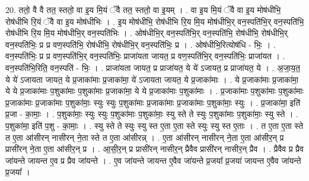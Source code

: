 \documentclass[17pt]{extarticle}
\begin{document}
20. ततो॒ वै वै तत॒ स्ततो॒ वा इ॒य मि॒यं ॅवै तत॒ स्ततो॒ वा इ॒यम् । . वा इ॒य मि॒यं ॅवै वा इ॒य मोष॑धीभि॒ रोष॑धीभि रि॒यं ॅवै वा इ॒य मोष॑धीभिः । . इ॒य मोष॑धीभि॒ रोष॑धीभि रि॒य मि॒य मोष॑धीभि॒र् वन॒स्पति॑भि॒र् वन॒स्पति॑भि॒ रोष॑धीभि रि॒य मि॒य मोष॑धीभि॒र् वन॒स्पति॑भिः । . ओष॑धीभि॒र् वन॒स्पति॑भि॒र् वन॒स्पति॑भि॒ रोष॑धीभि॒ रोष॑धीभि॒र् वन॒स्पति॑भिः॒ प्र प्र वण॒स्पति॑भि॒ रोष॑धीभि॒ रोष॑धीभि॒र् वन॒स्पति॑भिः॒ प्र । . ओष॑धीभि॒रित्योष॑धि - भिः॒ । . वन॒स्पति॑भिः॒ प्र प्र वण॒स्पति॑भि॒र् वन॒स्पति॑भिः॒ प्राजा॑यता जायत॒ प्र वण॒स्पति॑भि॒र् वन॒स्पति॑भिः॒ प्राजा॑यत । . वन॒स्पति॑भि॒रिति॒ वन॒स्पति॑ - भिः॒ । . प्राजा॑यता जायत॒ प्र प्राजा॑यत॒ ये ये॑ ऽजायत॒ प्र प्राजा॑यत॒ ये । . अ॒जा॒य॒त॒ ये ये॑ ऽजायता जायत॒ ये प्र॒जाका॑माः प्र॒जाका॑मा॒ ये॑ ऽजायता जायत॒ ये प्र॒जाका॑माः । . ये प्र॒जाका॑माः प्र॒जाका॑मा॒ ये ये प्र॒जाका॑माः प॒शुका॑माः प॒शुका॑माः प्र॒जाका॑मा॒ ये ये प्र॒जाका॑माः प॒शुका॑माः । . प्र॒जाका॑माः प॒शुका॑माः प॒शुका॑माः प्र॒जाका॑माः प्र॒जाका॑माः प॒शुका॑माः॒ स्युः स्युः प॒शुका॑माः प्र॒जाका॑माः प्र॒जाका॑माः प॒शुका॑माः॒ स्युः । . प्र॒जाका॑मा॒ इति॑ प्र॒जा - का॒माः॒ । . प॒शुका॑माः॒ स्युः स्युः प॒शुका॑माः प॒शुका॑माः॒ स्यु स्ते ते स्युः प॒शुका॑माः प॒शुका॑माः॒ स्यु स्ते । . प॒शुका॑मा॒ इति॑ प॒शु - का॒माः॒ । . स्यु स्ते ते स्युः स्यु स्त ए॒ता ए॒ता स्ते स्युः स्यु स्त ए॒ताः । . त ए॒ता ए॒ता स्ते त ए॒ता आ॑सीरन् नासीरन् ने॒ता स्ते त ए॒ता आ॑सीरन्न् । . ए॒ता आ॑सीरन् नासीरन् ने॒ता ए॒ता आ॑सीर॒न् प्र प्रासी॑रन् ने॒ता ए॒ता आ॑सीर॒न् प्र । . आ॒सी॒र॒न् प्र प्रासी॑रन् नासीर॒न् प्रैवैव प्रासी॑रन् नासीर॒न् प्रैव । . प्रैवैव प्र प्रैव जा॑यन्ते जायन्त ए॒व प्र प्रैव जा॑यन्ते । . ए॒व जा॑यन्ते जायन्त ए॒वैव जा॑यन्ते प्र॒जया᳚ प्र॒जया॑ जायन्त ए॒वैव जा॑यन्ते प्र॒जया᳚ । \newline
\end{document}
